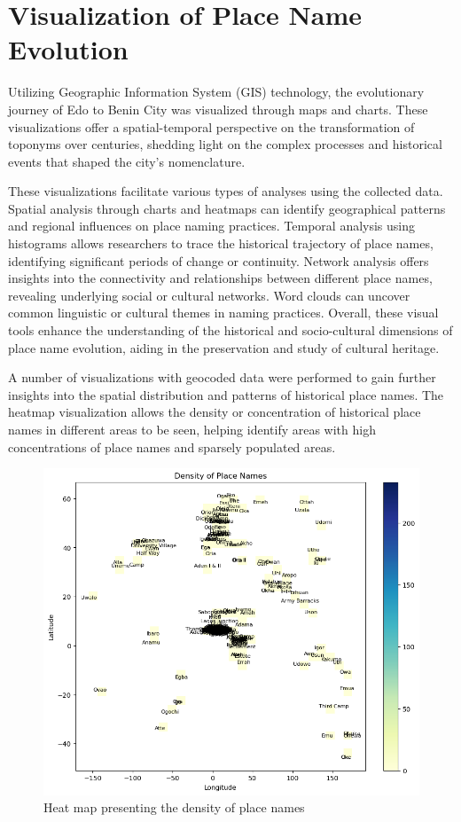 \section{Visualization of Place Name Evolution}

Utilizing Geographic Information System (GIS) technology, the evolutionary journey of Edo to Benin City was visualized through maps and charts. These visualizations offer a spatial-temporal perspective on the transformation of toponyms over centuries, shedding light on the complex processes and historical events that shaped the city's nomenclature.

These visualizations facilitate various types of analyses using the collected data. Spatial analysis through charts and heatmaps can identify geographical patterns and regional influences on place naming practices. Temporal analysis using histograms allows researchers to trace the historical trajectory of place names, identifying significant periods of change or continuity. Network analysis offers insights into the connectivity and relationships between different place names, revealing underlying social or cultural networks. Word clouds can uncover common linguistic or cultural themes in naming practices. Overall, these visual tools enhance the understanding of the historical and socio-cultural dimensions of place name evolution, aiding in the preservation and study of cultural heritage.

A number of visualizations with geocoded data were performed to gain further insights into the spatial distribution and patterns of historical place names. The heatmap visualization allows the density or concentration of historical place names in different areas to be seen, helping identify areas with high concentrations of place names and sparsely populated areas.

\begin{figure}[H]
    \centering
    \includegraphics[width=1\linewidth]{heatmap1.png}
    \caption{Heat map presenting the density of place names}
    \label{fig:heatmap}
\end{figure}


